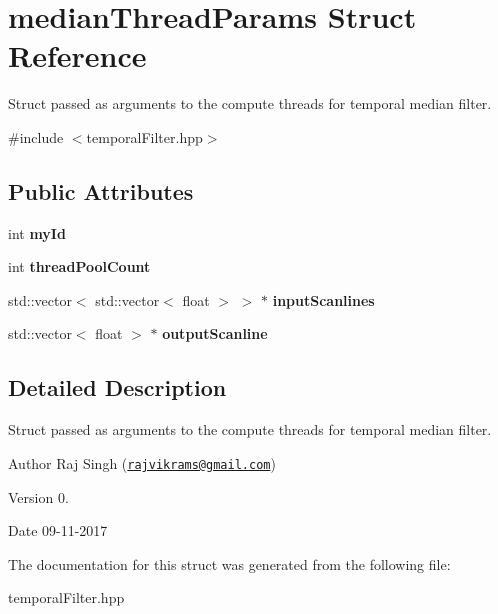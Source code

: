 \hypertarget{structmedian_thread_params}{}\section{median\+Thread\+Params Struct Reference}
\label{structmedian_thread_params}


Struct passed as arguments to the compute threads for temporal median filter.  




{\ttfamily \#include $<$temporal\+Filter.\+hpp$>$}

\subsection*{Public Attributes}
\begin{DoxyCompactItemize}
\item 
\mbox{\label{structmedian_thread_params_a8db108c4609858e869578e9765954486}} 
int {\bfseries my\+Id}
\item 
\mbox{\label{structmedian_thread_params_ab5a693b517ff20c278208aa3b2a20b54}} 
int {\bfseries thread\+Pool\+Count}
\item 
\mbox{\label{structmedian_thread_params_a4bac74b30318ffb7d08cb358215319db}} 
std\+::vector$<$ std\+::vector$<$ float $>$ $>$ $\ast$ {\bfseries input\+Scanlines}
\item 
\mbox{\label{structmedian_thread_params_ae615afd49e1de11d8471bc27b48df7ae}} 
std\+::vector$<$ float $>$ $\ast$ {\bfseries output\+Scanline}
\end{DoxyCompactItemize}


\subsection{Detailed Description}
Struct passed as arguments to the compute threads for temporal median filter. 

\begin{DoxyAuthor}{Author}
Raj Singh (\href{mailto:rajvikrams@gmail.com}{\tt rajvikrams@gmail.\+com}) 
\end{DoxyAuthor}
\begin{DoxyVersion}{Version}
0. 
\end{DoxyVersion}
\begin{DoxyDate}{Date}
09-\/11-\/2017 
\end{DoxyDate}


The documentation for this struct was generated from the following file\+:\begin{DoxyCompactItemize}
\item 
temporal\+Filter.\+hpp\end{DoxyCompactItemize}
